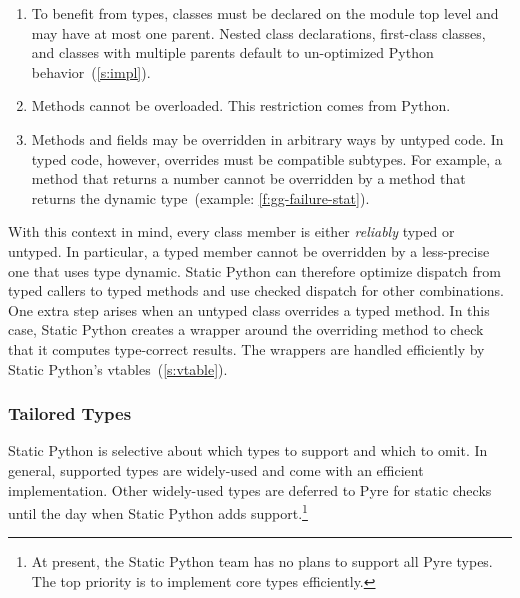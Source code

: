 \documentclass[english,cleveref,submission]{programming}
\newcommand{\SP}{Static Python}
\newcommand{\code}[1]{\texttt{#1}}
\begin{document}
\begin{enumerate}
  \item
    To benefit from types, classes must be declared on the module top level
    and may have at most one parent.
    Nested class declarations, first-class classes, and classes with
    multiple parents default to un-optimized Python behavior~(\cref{s:impl}).

  \item
    Methods cannot be overloaded.
    This restriction comes from Python.

  \item
    Methods and fields may be overridden in arbitrary ways by untyped code.
    In typed code, however, overrides must be compatible subtypes.
    For example, a method that returns a number cannot be overridden by a method
    that returns the dynamic type~(example: \cref{f:gg-failure-stat}).


\end{enumerate}
%
With this context in mind, every class member is either \emph{reliably} typed or untyped.
In particular, a typed member cannot be overridden by a less-precise one that uses
type dynamic.
\SP{} can therefore optimize dispatch from typed callers to typed methods
and use checked dispatch for other combinations.
One extra step arises when an untyped class overrides a typed method.
In this case, \SP{} creates a wrapper around the overriding method to check
that it computes type-correct results.
The wrappers are handled efficiently by \SP{}'s vtables~(\cref{s:vtable}).


\subsubsection{Tailored Types}
\label{s:idiomatic-types}

\SP{} is selective about which types to support and which to omit.
In general, supported types are widely-used and come with an efficient
implementation.
Other widely-used types are deferred to Pyre for static checks until
the day when \SP{} adds support.\footnote{At present, the \SP{} team
has no plans to support all Pyre types. The top priority is to implement
core types efficiently.}
\end{document}
